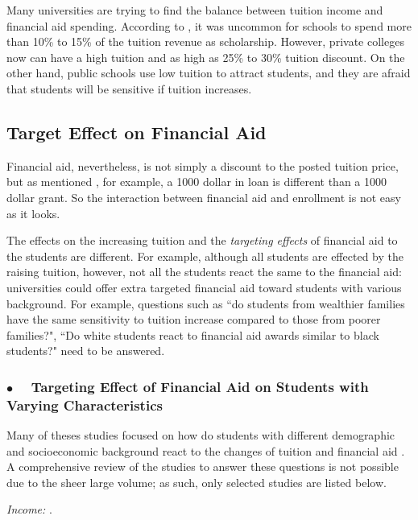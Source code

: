 \documentclass[12pt,english]{report}
\begin{document}
Many universities are trying to find the balance between tuition income and financial aid
spending.  According to \citep{Hossler1998}, it was uncommon for schools to spend more than
10\% to 15\% of the tuition revenue as scholarship. However, private colleges now can have a 
high tuition and as high as 25\% to 30\% tuition discount. On the other hand, public schools
use low tuition to attract students, and they are afraid that students will be sensitive if 
tuition increases.



\subsection{Target Effect on Financial Aid}

Financial aid, nevertheless, is not simply a discount to the posted tuition price, but as 
\citet{Heller1997} mentioned , for example, a 1000 dollar in loan is different 
than a 1000 dollar grant. So the interaction between financial aid and enrollment is 
not easy as it looks.

The effects on the increasing tuition and the \textit{targeting effects} of financial aid to
the students are different. For example, although all students are effected by the raising 
tuition, however, not all the students react the same to the financial aid: universities could
offer extra targeted financial aid toward students with various background.
For example,  questions such as ``do students from wealthier families have the same sensitivity to tuition 
increase compared to those from poorer families?",  ``Do white students react to financial aid 
awards similar to black students?" need to be answered.

\subsubsection{$\bullet \quad$  Targeting Effect of Financial Aid on Students with Varying 
Characteristics }
Many of theses studies focused on how do students with different demographic and 
socioeconomic background react to the changes of tuition and financial aid
\citep{Jackson1978,Braunstein1999,Heller1997}.  A comprehensive review of the studies to 
answer  these questions is not possible due to the sheer large volume; as such, only selected 
studies  are listed below.

\vspace{0.15in}
\noindent \textit{Income:}  \citep{Crouse2015}.
\end{document}
